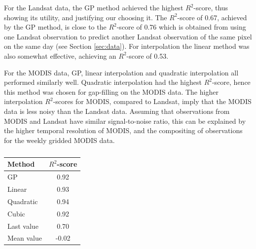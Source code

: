 \documentclass[review]{elsarticle}
\begin{document}
For the Landsat data, the GP method achieved the highest $R^2$-score, thus showing its utility, and justifying our choosing it. The $R^2$-score of 0.67, achieved by the GP method, is close to the $R^2$-score of 0.76 which is obtained from using one Landsat observation to predict another Landsat observation of the same pixel on the same day (see Section \ref{sec:data}). For interpolation the linear method was also somewhat effective, achieving an $R^2$-score of 0.53. 


For the MODIS data, GP, linear interpolation and quadratic interpolation all performed similarly well. Quadratic interpolation had the highest $R^2$-score, hence this method was chosen for gap-filling on the MODIS data. The higher interpolation $R^2$-scores for MODIS, compared to Landsat, imply that the MODIS data is less noisy than the Landsat data. Assuming that observations from MODIS and Landsat have similar signal-to-noise ratio, this can be explained by the higher temporal resolution of MODIS, and the compositing of  observations for the weekly gridded MODIS data.

\begin{table}
	\caption{ 
	} \label{tab:comp_int2}
	\centering
	\begin{tabular}{lc} 
		\toprule
		\textbf{Method}  & \textbf{$R^2$-score} \\
		\midrule
		GP & 0.92 \\
		Linear & 0.93\\
		Quadratic & 0.94\\
		Cubic & 0.92\\
		Last value & 0.70\\
		Mean value & -0.02\\
		\bottomrule
	\end{tabular}
\end{table}

\end{document}
